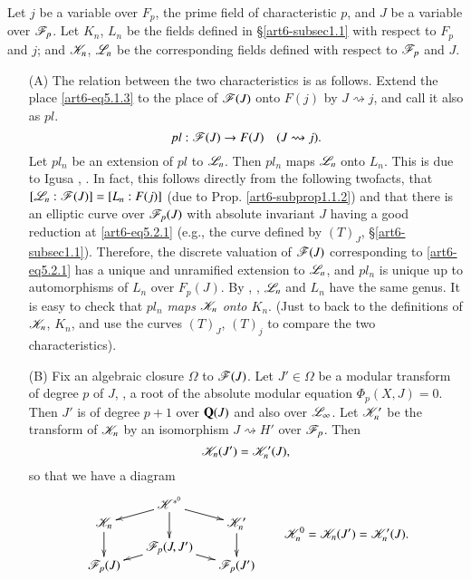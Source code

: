 Let $j$ be a variable over $F_p$, the prime field of characteristic $p$, and $J$ be a variable over $\mathscr{F}_p$. Let $K_n$, $L_n$ be the fields defined in \S \eqref{art6-subsec1.1} with respect to $F_p$ and $j$; and $\mathscr{K}_n$, $\mathscr{L}_n$ be the corresponding fields defined with respect to $\mathscr{F}_p$ and $J$.

\begin{itemize}
\item[(A)] The relation between the two characteristics is as follows. Extend the place \eqref{art6-eq5.1.3} to the place of $\mathscr{F} (J)$ onto $F(j)$ by $J \rightsquigarrow j$, and call it also as $pl$.
\setcounter{equation}{0}
\begin{equation}
pl : \mathscr{F} (J) \to F (J) \quad (J \rightsquigarrow j). 
\label{art6-eq5.2.1}
\end{equation}
Let $pl_n$ be an extension of $pl$ to $\mathscr{L}_n$. Then $pl_n$ maps $\mathscr{L}_n$ onto $L_n$. This is due to Igusa \cite{art6-key5}, \cite{art6-key6}. In fact, this follows directly from the following two\pageoriginale facts, that $[\mathscr{L}_n: \mathscr{F} (J)] = [L_n : F(j)]$ (due to Prop. \ref{art6-subprop1.1.2}) and that there is an elliptic curve over $\mathscr{F}_p (J)$ with absolute invariant $J$ having a good reduction at \eqref{art6-eq5.2.1} (e.g., the curve defined by $(T)_J$, \S \ref{art6-subsec1.1}). Therefore, the discrete valuation of $\mathscr{F}(J)$ corresponding to \eqref{art6-eq5.2.1} has a unique and unramified extension  to $\mathscr{L}_n$, and $pl_n$ is unique up to automorphisms of $L_n$ over $F_p(J)$. By \cite{art6-key5}, \cite{art6-key6}, $\mathscr{L}_n$ and $L_n$ have the same genus. It is easy to check that $pl_n$ \textit{maps $\mathscr{K}_n$ onto $K_n$}. (Just to back to the definitions of $\mathscr{K}_n$, $K_n$, and use the curves $(T)_J$, $(T)_j$ to compare the two characteristics).

\item[(B)] Fix an algebraic closure $\Omega$ to $\mathscr{F}(J)$. Let $J' \in \Omega$ be a modular transform of degree $p$ of $J$, \ie, a root of the absolute modular equation $\Phi_p (X, J) = 0$. Then $J'$ is of degree $p+1$ over $\mathbf{Q} (J)$ and also over $\mathscr{L}_\infty$. Let $\mathscr{K}'_n$ be the transform of $\mathscr{K}_n$ by an isomorphism $J \rightsquigarrow H'$ over $\mathscr{F}_p$. Then
\begin{equation}
\mathscr{K}_n(J') = \mathscr{K}'_n(J), \label{art6-eq5.2.2}
\end{equation}
so that we have a diagram 
\begin{equation}
\vcenter{
\xymatrix@R=-0.05cm@C=0.5cm{
& \sK^{\ast^0} \ar[dr] \ar[dl] \ar[ddd] & \\
\sK_n \ar[ddd]&&  \sK'_n \ar[ddd]\\
& & &\\
& \sF_p (J,J') \ar[dr] \ar[dl]& \\
\sF_p(J) & & \sF_p (J')}} \sK^0_n = \sK_n (J') = \sK'_n(J). \label{art6-eq5.2.3}
\end{equation}


\end{itemize}
